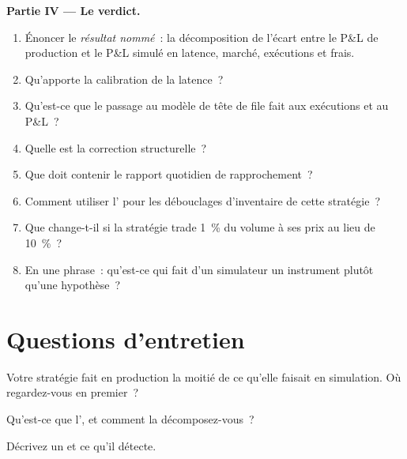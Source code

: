 \begin{problem}
\medskip\noindent\textbf{Partie IV --- Le verdict.}
\begin{enumerate}[resume]
\item Énoncer le \emph{résultat nommé}~: la décomposition de l'écart entre le P\&L de production et le P\&L simulé en latence, marché, exécutions et frais.
\item Qu'apporte la calibration de la latence~?
\item Qu'est-ce que le passage au modèle de tête de file fait aux exécutions et au P\&L~?
\item Quelle est la correction structurelle~?
\item Que doit contenir le rapport quotidien de rapprochement~?
\item Comment utiliser l' pour les débouclages d'inventaire de cette stratégie~?
\item Que change-t-il si la stratégie trade 1~\% du volume à ses prix au lieu de 10~\%~?
\item En une phrase~: qu'est-ce qui fait d'un simulateur un instrument plutôt qu'une hypothèse~?
\end{enumerate}
\end{problem}

\section{Questions d'entretien}

\begin{interviewq}\label{iq:rs:simulation-versus-live:1}
Votre stratégie fait en production la moitié de ce qu'elle faisait en simulation. Où regardez-vous en premier~?
\end{interviewq}

\begin{interviewq}\label{iq:rs:simulation-versus-live:2}
Qu'est-ce que l', et comment la décomposez-vous~?
\end{interviewq}

\begin{interviewq}\label{iq:rs:simulation-versus-live:3}
Décrivez un  et ce qu'il détecte.
\end{interviewq}

